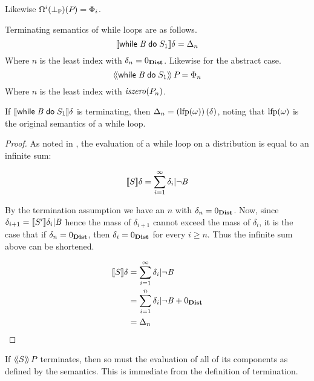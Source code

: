 Likewise $ \Omega^i(\bot_{\mathbb{P}})(P_{}) = \Phi_i $.

\begin{definition} Terminating semantics of while loops are as follows.
$$ [\![{\mathsf{while}\;{\mathit{B}}\;\mathsf{do}\;{S_1}}]\!]{\delta} = \Delta_n $$
Where $ n $ is the least index with $ \delta_n = 0_{\textbf{Dist}} $. Likewise for the abstract case.
$$ \langle\!\langle{\mathsf{while}\;{\mathit{B}}\;\mathsf{do}\;{S_1}}\rangle\!\rangle\,{P_{}} = \Phi_n $$
Where $ n $ is the least index with $ \mathit{iszero}(P_{n}) $.
\end{definition}

\begin{lemma} \label{lem:pp:while:infinite} If $ [\![{\mathsf{while}\;{\mathit{B}}\;\mathsf{do}\;{S_1}}]\!]{\delta} $ is
terminating, then $ \Delta_n = \left( \mathrm{lfp}(\omega) \right)(\delta) $, noting
that $ \mathrm{lfp}(\omega) $ is the original semantics of a while loop.
\end{lemma}
\begin{proof} As noted in \cite{monniaux00prob}, the evaluation of
a while loop on a distribution is equal to an infinite sum:

$$ [\![{S}]\!]{\delta} = \sum_{i = 1}^{\infty} \delta_i | \neg \mathit{B} $$

By the termination assumption we have an $ n $ with $ \delta_n
= 0_{\textbf{Dist}} $. Now, since $ \delta_{i+1}
= [\![{S'}]\!]{\delta_i | \mathit{B}} $ hence the mass of
$ \delta_{i+1} $ cannot exceed the mass of $ \delta_i $, it is the
case that if $ \delta_n = 0_{\textbf{Dist}} $, then $ \delta_i = 0_{\textbf{Dist}} $
for every $ i \geq n $. Thus the infinite sum above can be shortened.

\begin{align*}
[\![{S}]\!]{\delta} & = \sum_{i =
1}^{\infty} \delta_i | \neg \mathit{B} \\
 & = \sum_{i=1}^{n} \delta_i | \neg \mathit{B} + 0_{\textbf{Dist}} \\
 & = \Delta_n
\end{align*}

\end{proof}

\begin{remark} \label{lem:pp:while:terminate} If
$ \langle\!\langle{S}\rangle\!\rangle\,{P_{}} $ terminates, then so must the evaluation of
all of its components as defined by the semantics. This is immediate
from the definition of termination.
\end{remark}

%

